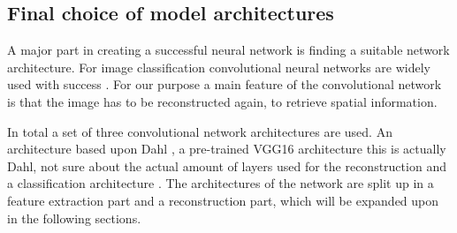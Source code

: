 \subsection{Final choice of model architectures}

{\color{red} 

A major part in creating a successful neural network is finding a suitable network architecture. For image classification convolutional neural networks are widely used with success \cite{Krizhevsky,Szegedy,Simonyan}. For our purpose a main feature of the convolutional network is that the image has to be reconstructed again, to retrieve spatial information.


In total a set of three convolutional network architectures are used. An architecture based upon Dahl \cite{Dahl}, a pre-trained VGG16 \cite{Simonyan} architecture {\color{red} this is actually Dahl,  not sure about the actual amount of layers used for the reconstruction} and a classification architecture \cite{Zhang}. The architectures of the network are split up in a feature extraction part and a reconstruction part, which will be expanded upon in the following sections.}\\ 
\\%


